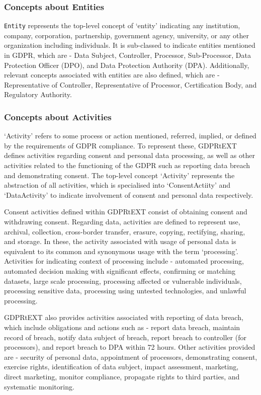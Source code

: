 \subsubsection{Concepts about Entities}
\texttt{Entity} represents the top-level concept of `entity' indicating any institution, company, corporation, partnership, government agency, university, or any other organization including individuals. 
It is sub-classed to indicate entities mentioned in GDPR, which are - Data Subject, Controller, Processor, Sub-Processor, Data Protection Officer (DPO), and Data Protection Authority (DPA). Additionally, relevant concepts associated with entities are also defined, which are -  Representative of Controller, Representative of Processor, Certification Body, and Regulatory Authority.

\subsubsection{Concepts about Activities}
`Activity' refers to some process or action mentioned, referred, implied, or defined by the requirements of GDPR compliance. To represent these, GDPRtEXT defines activities regarding consent and personal data processing, as well as other activities related to the functioning of the GDPR such as reporting data breach and demonstrating consent. The top-level concept `Activity' represents the abstraction of all activities, which is specialised into `ConsentActiity' and `DataActivity' to indicate involvement of consent and personal data respectively.

Consent activities defined within GDPRtEXT consist of obtaining consent and withdrawing consent. Regarding data, activities are defined to represent use, archival, collection, cross-border transfer, erasure, copying, rectifying, sharing, and storage. In these, the activity associated with usage of personal data is equivalent to its common and synonymous usage with the term `processing'. Activities for indicating context of processing include - automated processing,  automated decision making with significant effects, confirming or matching datasets, large scale processing, processing affected or vulnerable individuals, processing sensitive data, processing using untested technologies, and unlawful processing.

GDPRtEXT also provides activities associated with reporting of data breach, which include obligations and actions such as - report data breach, maintain record of breach, notify data subject of breach, report breach to controller (for processors), and report breach to DPA within 72 hours. Other activities provided are - security of personal data, appointment of processors, demonstrating consent, exercise rights, identification of data subject, impact assessment, marketing, direct marketing, monitor compliance, propagate rights to third parties, and systematic monitoring.

